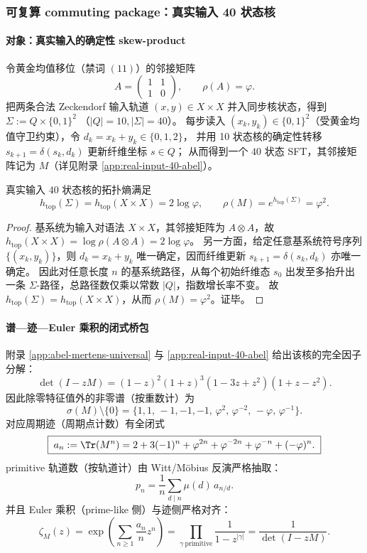 \subsubsection{可复算 commuting package：真实输入 40 状态核}\label{subsec:real-input-40-commuting-package}
\paragraph{对象：真实输入的确定性 skew-product}
令黄金均值移位（禁词 $(11)$）的邻接矩阵
\[
A=\begin{pmatrix}1&1\\[2pt]1&0\end{pmatrix},\qquad \rho(A)=\varphi.
\]
把两条合法 Zeckendorf 输入轨道 $(x,y)\in X\times X$ 并入同步核状态，得到
\(
\Sigma:=Q\times\{0,1\}^2
\)
（$|Q|=10,|\Sigma|=40$）。
每步读入 $(x_k,y_k)\in\{0,1\}^2$（受黄金均值守卫约束），令 $d_k=x_k+y_k\in\{0,1,2\}$，
并用 10 状态核的确定性转移 $s_{k+1}=\delta(s_k,d_k)$ 更新纤维坐标 $s\in Q$；
从而得到一个 $40$ 状态 SFT，其邻接矩阵记为 $M$（详见附录 \ref{app:real-input-40-abel}）。

\begin{proposition}[确定性扩张不增熵：$\rho(M)=\varphi^2$]\label{prop:real-input-40-entropy}
真实输入 $40$ 状态核的拓扑熵满足
\[
h_{\mathrm{top}}(\Sigma)=h_{\mathrm{top}}(X\times X)=2\log\varphi,
\qquad
\rho(M)=e^{h_{\mathrm{top}}(\Sigma)}=\varphi^2.
\]
\end{proposition}
\begin{proof}
基系统为输入对语法 $X\times X$，其邻接矩阵为 $A\otimes A$，故 $h_{\mathrm{top}}(X\times X)=\log\rho(A\otimes A)=2\log\varphi$。
另一方面，给定任意基系统符号序列 $\{(x_k,y_k)\}$，则 $d_k=x_k+y_k$ 唯一确定，因而纤维更新 $s_{k+1}=\delta(s_k,d_k)$ 亦唯一确定。
因此对任意长度 $n$ 的基系统路径，从每个初始纤维态 $s_0$ 出发至多抬升出一条 $\Sigma$-路径，总路径数仅乘以常数 $|Q|$，指数增长率不变。
故 $h_{\mathrm{top}}(\Sigma)=h_{\mathrm{top}}(X\times X)$，从而 $\rho(M)=\varphi^2$。证毕。
\end{proof}

\paragraph{谱—迹—Euler 乘积的闭式桥包}
附录 \ref{app:abel-mertens-universal} 与 \ref{app:real-input-40-abel} 给出该核的完全因子分解：
\[
\boxed{\;
\det(I-zM)=(1-z)^2(1+z)^3(1-3z+z^2)(1+z-z^2).\;}
\]
因此除零特征值外的非零谱（按重数计）为
\[
\sigma(M)\setminus\{0\}=\{1,1,\,-1,-1,-1,\,\varphi^2,\,\varphi^{-2},\,-\varphi,\,\varphi^{-1}\}.
\]
对应周期迹（周期点计数）有全闭式
\[
\boxed{\;
a_n:=\Tr(M^n)=
2+3(-1)^n+\varphi^{2n}+\varphi^{-2n}+\varphi^{-n}+(-\varphi)^n.\;}
\]
primitive 轨道数（按轨道计）由 Witt/Möbius 反演严格抽取：
\[
\boxed{\;
p_n=\frac1n\sum_{d\mid n}\mu(d)\,a_{n/d}.\;}
\]
并且 Euler 乘积（prime-like 侧）与迹侧严格对齐：
\[
\zeta_M(z)
=\exp\!\left(\sum_{n\ge 1}\frac{a_n}{n}z^n\right)
=\prod_{\gamma\ \mathrm{primitive}}\frac{1}{1-z^{|\gamma|}}
=\frac{1}{\det(I-zM)}.
\]

